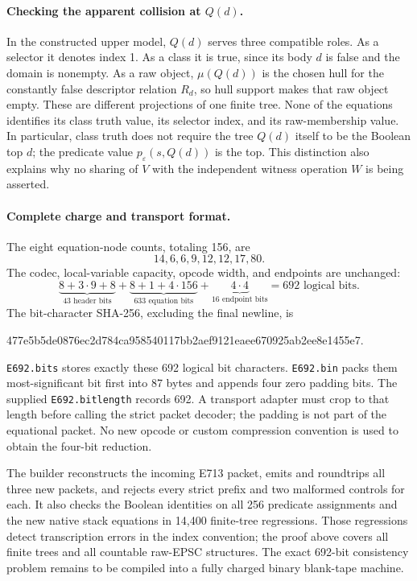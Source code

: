 \paragraph{Checking the apparent collision at $Q(d)$.}
In the constructed upper model, $Q(d)$ serves three compatible roles.
As a selector it denotes index 1.  As a class it is true, since its
body $d$ is false and the domain is nonempty.  As a raw object,
$\mu(Q(d))$ is the chosen hull for the constantly false descriptor
relation $R_d$, so hull support makes that raw object empty.
These are different projections of one finite tree.  None of the
equations identifies its class truth value, its selector index, and
its raw-membership value.  In particular, class truth does not
require the tree $Q(d)$ itself to be the Boolean top $d$; the
predicate value $p_\varepsilon(s,Q(d))$ is the top.  This distinction
also explains why no sharing of $V$ with the independent witness
operation $W$ is being asserted.

\paragraph{Complete charge and transport format.}
The eight equation-node counts, totaling 156, are
\[
 14,6,6,9,12,12,17,80.
\]
The codec, local-variable
capacity, opcode width, and endpoints are unchanged:
\[
 \underbrace{8+3\cdot9+8}_{43\text{ header bits}}
 +\underbrace{8+1+4\cdot156}_{633\text{ equation bits}}
 +\underbrace{4\cdot4}_{16\text{ endpoint bits}}
 =\boxed{692\text{ logical bits}}.
\]
The bit-character SHA-256, excluding the final newline, is
\begin{center}\scriptsize\ttfamily
477e5b5de0876ec2d784ca958540117bb2aef9121eaee670925ab2ee8e1455e7.
\end{center}
\texttt{E692.bits} stores exactly these 692 logical bit characters.
\texttt{E692.bin} packs them most-significant bit first into 87 bytes
and appends four zero padding bits.  The supplied
\texttt{E692.bitlength} records 692.  A transport adapter must crop
to that length before calling the strict packet decoder; the padding
is not part of the equational packet.  No new opcode or custom
compression convention is used to obtain the four-bit reduction.

The builder reconstructs the incoming E713 packet, emits and
roundtrips all three new packets, and rejects every strict prefix
and two malformed controls for each.  It also checks the Boolean
identities on all 256 predicate assignments and the new native stack
equations in 14,400 finite-tree regressions.  Those regressions detect
transcription errors in the index convention; the proof above covers
all finite trees and all countable raw-EPSC structures.  The exact
692-bit consistency problem remains to be compiled into a fully
charged binary blank-tape machine.

